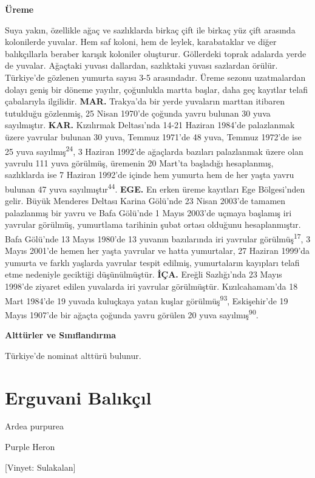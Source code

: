 \documentclass[
  letterpaper,
  DIV=11,
  numbers=noendperiod]{scrreprt}
\begin{document}
\textbf{Üreme}

Suya yakın, özellikle ağaç ve sazlıklarda birkaç çift ile birkaç yüz
çift arasında kolonilerde yuvalar. Hem saf koloni, hem de leylek,
karabataklar ve diğer balıkçıllarla beraber karışık koloniler oluşturur.
Göllerdeki toprak adalarda yerde de yuvalar. Ağaçtaki yuvası dallardan,
sazlıktaki yuvası sazlardan örülür. Türkiye'de gözlenen yumurta sayısı
3-5 arasındadır. Üreme sezonu uzatmalardan dolayı geniş bir döneme
yayılır, çoğunlukla martta başlar, daha geç kayıtlar telafi çabalarıyla
ilgilidir. \textbf{MAR.} Trakya'da bir yerde yuvaların marttan itibaren
tutulduğu gözlenmiş, 25 Nisan 1970'de çoğunda yavru bulunan 30 yuva
sayılmıştır. \textbf{KAR.} Kızılırmak Deltası'nda 14-21 Haziran 1984'de
palazlanmak üzere yavrular bulunan 30 yuva, Temmuz 1971'de 48 yuva,
Temmuz 1972'de ise 25 yuva sayılmış\textsuperscript{24}, 3 Haziran
1992'de ağaçlarda bazıları palazlanmak üzere olan yavrulu 111 yuva
görülmüş, üremenin 20 Mart'ta başladığı hesaplanmış, sazlıklarda ise 7
Haziran 1992'de içinde hem yumurta hem de her yaşta yavru bulunan 47
yuva sayılmıştır\textsuperscript{44}. \textbf{EGE.} En erken üreme
kayıtları Ege Bölgesi'nden gelir. Büyük Menderes Deltası Karina Gölü'nde
23 Nisan 2003'de tamamen palazlanmış bir yavru ve Bafa Gölü'nde 1 Mayıs
2003'de uçmaya başlamış iri yavrular görülmüş, yumurtlama tarihinin
şubat ortası olduğunu hesaplanmıştır. Bafa Gölü'nde 13 Mayıs 1980'de 13
yuvanın bazılarında iri yavrular görülmüş\textsuperscript{17}, 3 Mayıs
2001'de hemen her yaşta yavrular ve hatta yumurtalar, 27 Haziran 1999'da
yumurta ve farklı yaşlarda yavrular tespit edilmiş, yumurtaların
kayıpları telafi etme nedeniyle geciktiği düşünülmüştür. \textbf{İÇA.}
Ereğli Sazlığı'nda 23 Mayıs 1998'de ziyaret edilen yuvalarda iri
yavrular görülmüştür. Kızılcahamam'da 18 Mart 1984'de 19 yuvada
kuluçkaya yatan kuşlar görülmüş\textsuperscript{93}, Eskişehir'de 19
Mayıs 1907'de bir ağaçta çoğunda yavru görülen 20 yuva
sayılmış\textsuperscript{90}.

\textbf{Alttürler ve Sınıflandırma}

Türkiye'de nominat alttürü bulunur.

\section{Erguvani Balıkçıl}\label{erguvani-balux131kuxe7ux131l}

Ardea purpurea

Purple Heron

{[}Vinyet: Sulakalan{]}
\end{document}
